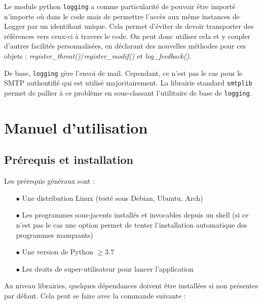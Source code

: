 \documentclass[]{article}
\begin{document}
Le module python \texttt{logging} a comme particularité de pouvoir être importé n'importe où dans le code mais de permettre l'accès aux même instances de Logger par un identifiant unique. Cela permet d'éviter de devoir transporter des références vers ceux-ci à travers le code. On peut donc utiliser cela et y coupler d'autres facilités personnalisées, en déclarant des nouvelles méthodes pour ces objets : \textit{register\_threat()}/\textit{register\_modif()} et \textit{log\_feedback()}.\\

\par De base, \texttt{logging} gère l'envoi de mail. Cependant, ce n'est pas le cas pour le SMTP authentifié qui est utilisé majoritairement. La librairie standard \texttt{smtplib} permet de pallier à ce problème en sous-classant l'utilitaire de base de \texttt{logging}.



\newpage

\section{Manuel d'utilisation}

\subsection{Prérequis et installation}
\label{install}
Les prérequis généraux sont :
\begin{itemize}
\vspace{0.1cm}
\item[$\bullet$] Une distribution Linux (testé sous Debian, Ubuntu, Arch)
\vspace{0.1cm}
\item[$\bullet$] Les programmes sous-jacents installés et invocables depuis un shell (si ce n'est pas le cas une option permet de tenter l'installation automatique des programmes manquants)
\vspace{0.1cm}
\item[$\bullet$] Une version de Python $\geq 3.7$
\vspace{0.1cm}
\item[$\bullet$] Les droits de super-utilisateur pour lancer l'application
\end{itemize}
\vspace{0.1cm}

Au niveau librairies, quelques dépendances doivent être installées si non présentes par défaut. Cela peut se faire avec la commande suivante :\\
\end{document}
